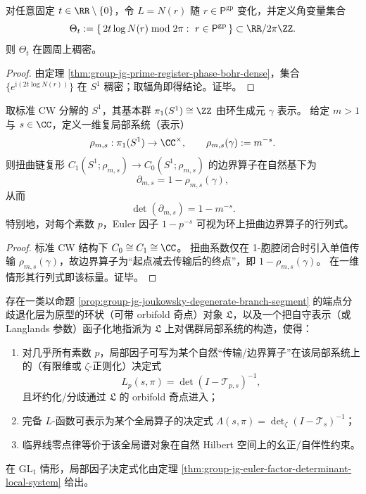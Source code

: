 \begin{corollary}[寄存器变参实现的谱交叉角扫描稠密性]\label{cor:group-jg-prime-register-phase-scan-dense}
对任意固定 \(t\in\RR\setminus\{0\}\)，令 \(L=N(r)\) 随 \(r\in \mathsf{P}^{\mathrm{gp}}\) 变化，并定义角变量集合
\[
\Theta_t:=\{\,2t\log N(r)\bmod 2\pi:\ r\in \mathsf{P}^{\mathrm{gp}}\,\}\subset \RR/2\pi\ZZ.
\]
则 \(\Theta_t\) 在圆周上稠密。
\end{corollary}
\begin{proof}
由定理 \ref{thm:group-jg-prime-register-phase-bohr-dense}，集合 \(\{e^{\mathrm{i}(2t\log N(r))}\}\) 在 \(S^1\) 稠密；取辐角即得结论。证毕。
\end{proof}

\begin{theorem}\label{thm:group-jg-euler-factor-determinant-local-system}
取标准 CW 分解的 \(S^1\)，其基本群 \(\pi_1(S^1)\cong\ZZ\) 由环生成元 \(\gamma\) 表示。
给定 \(m>1\) 与 \(s\in\CC\)，定义一维复局部系统（表示）
\[
\rho_{m,s}:\pi_1(S^1)\to\CC^\times,\qquad \rho_{m,s}(\gamma):=m^{-s}.
\]
则扭曲链复形 \(C_1(S^1;\rho_{m,s})\to C_0(S^1;\rho_{m,s})\) 的边界算子在自然基下为
\[
\partial_{m,s}=1-\rho_{m,s}(\gamma),
\]
从而
\[
\det(\partial_{m,s})=1-m^{-s}.
\]
特别地，对每个素数 \(p\)，Euler 因子 \(1-p^{-s}\) 可视为环上扭曲边界算子的行列式。
\end{theorem}
\begin{proof}
标准 CW 结构下 \(C_0\cong C_1\cong\CC\)。
扭曲系数仅在 1-胞腔闭合时引入单值传输 \(\rho_{m,s}(\gamma)\)，故边界算子为“起点减去传输后的终点”，即 \(1-\rho_{m,s}(\gamma)\)。
在一维情形其行列式即该标量。证毕。
\end{proof}

\begin{conjecture}\label{conj:group-jg-singular-loop-determinant-langlands}
存在一类以命题 \ref{prop:group-jg-joukowsky-degenerate-branch-segment} 的端点分歧退化层为原型的环状（可带 orbifold 奇点）对象 \(\mathfrak L\)，以及一个把自守表示（或 Langlands 参数）函子化地指派为 \(\mathfrak L\) 上对偶群局部系统的构造，使得：
\begin{enumerate}
  \item 对几乎所有素数 \(p\)，局部因子可写为某个自然“传输/边界算子”在该局部系统上的（有限维或 \(\zeta\)-正则化）决定式
  \[
  L_p(s,\pi)=\det(I-\mathcal T_{p,s})^{-1},
  \]
  且坏约化/分歧通过 \(\mathfrak L\) 的 orbifold 奇点进入；
  \item 完备 \(L\)-函数可表示为某个全局算子的决定式
  \(
  \Lambda(s,\pi)=\det_{\zeta}(I-\mathcal T_s)^{-1}
  \)；
  \item 临界线零点律等价于该全局谱对象在自然 Hilbert 空间上的幺正/自伴性约束。
\end{enumerate}
在 \(\mathrm{GL}_1\) 情形，局部因子决定式化由定理 \ref{thm:group-jg-euler-factor-determinant-local-system} 给出。
\end{conjecture}

